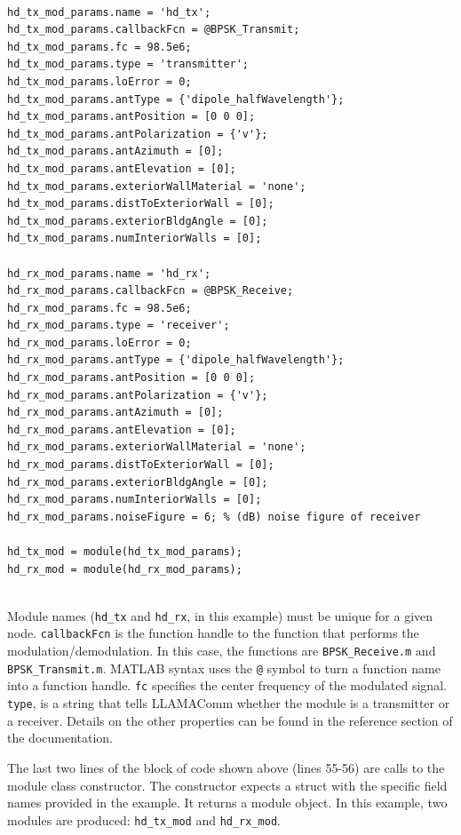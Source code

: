 \begin{lstlisting}[firstnumber = 22, name=hdBuildNodes]
% Define transmit/recieve modules

hd_tx_mod_params.name = 'hd_tx';
hd_tx_mod_params.callbackFcn = @BPSK_Transmit;
hd_tx_mod_params.fc = 98.5e6;
hd_tx_mod_params.type = 'transmitter';
hd_tx_mod_params.loError = 0;
hd_tx_mod_params.antType = {'dipole_halfWavelength'};
hd_tx_mod_params.antPosition = [0 0 0];
hd_tx_mod_params.antPolarization = {'v'};
hd_tx_mod_params.antAzimuth = [0];
hd_tx_mod_params.antElevation = [0];
hd_tx_mod_params.exteriorWallMaterial = 'none';
hd_tx_mod_params.distToExteriorWall = [0];
hd_tx_mod_params.exteriorBldgAngle = [0];
hd_tx_mod_params.numInteriorWalls = [0];

hd_rx_mod_params.name = 'hd_rx';
hd_rx_mod_params.callbackFcn = @BPSK_Receive;
hd_rx_mod_params.fc = 98.5e6;
hd_rx_mod_params.type = 'receiver';
hd_rx_mod_params.loError = 0;
hd_rx_mod_params.antType = {'dipole_halfWavelength'};
hd_rx_mod_params.antPosition = [0 0 0];
hd_rx_mod_params.antPolarization = {'v'};
hd_rx_mod_params.antAzimuth = [0];
hd_rx_mod_params.antElevation = [0];
hd_rx_mod_params.exteriorWallMaterial = 'none';
hd_rx_mod_params.distToExteriorWall = [0];
hd_rx_mod_params.exteriorBldgAngle = [0];
hd_rx_mod_params.numInteriorWalls = [0];
hd_rx_mod_params.noiseFigure = 6; % (dB) noise figure of receiver

hd_tx_mod = module(hd_tx_mod_params);
hd_rx_mod = module(hd_rx_mod_params);


\end{lstlisting}

Module names (\verb+hd_tx+ and \verb+hd_rx+, in this example) must
be unique for a given node.  \verb+callbackFcn+ is the function
handle to the function that performs the modulation/demodulation. In
this case, the functions are \verb+BPSK_Receive.m+ and
\verb+BPSK_Transmit.m+. MATLAB syntax uses the \verb+@+ symbol to
turn a function name into a function handle. \verb+fc+ specifies the
center frequency of the modulated signal. \verb+type+, is a string
that tells LLAMAComm whether the module is a transmitter or a
receiver. Details on the other properties can be found in the
reference section of the documentation.

The last two lines of the block of code shown above (lines 55-56)
are calls to the module class constructor.  The constructor expects
a struct with the specific field names provided in the example.  It
returns a module object.  In this example, two modules are produced:
\verb+hd_tx_mod+ and \verb+hd_rx_mod+.

